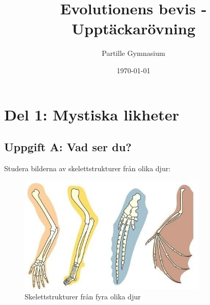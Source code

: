 \documentclass[a4paper,11pt]{article}
\title{Evolutionens bevis - Upptäckarövning}
\author{Partille Gymnasium}
\date{\today}
\begin{document}
\maketitle

\begin{center}
\end{center}

\newpage

\section{Del 1: Mystiska likheter}

\subsection{Uppgift A: Vad ser du?}

Studera bilderna av skelettstrukturer från olika djur:

\begin{figure}[H]
\centering
\includegraphics[width=0.8\textwidth]{homologous-organs.png}
\caption{Skelettstrukturer från fyra olika djur}
\end{figure}
\end{document}
